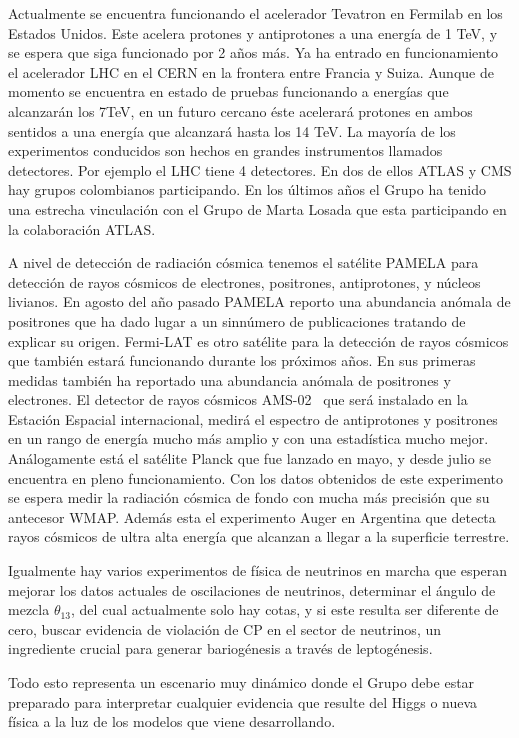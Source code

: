 Actualmente se encuentra funcionando el acelerador Tevatron en Fermilab en los Estados Unidos. Este acelera protones y antiprotones a una energía de 1 TeV, y se espera que siga funcionado por 2 años más. Ya ha entrado en funcionamiento el acelerador LHC en el CERN en la frontera entre Francia y Suiza. Aunque de momento se encuentra en estado de pruebas funcionando a energías que alcanzarán los 7TeV, en un futuro cercano éste acelerará protones en ambos sentidos a una energía que alcanzará hasta los 14 TeV. La mayoría de los experimentos conducidos son hechos en grandes instrumentos llamados detectores. Por ejemplo el LHC tiene 4 detectores. En dos de ellos ATLAS y CMS hay grupos colombianos participando. En los últimos años el Grupo ha tenido una estrecha vinculación con el Grupo de Marta Losada que esta participando en la colaboración ATLAS.

A nivel de detección de radiación cósmica tenemos el satélite PAMELA para detección de rayos cósmicos de electrones, positrones, antiprotones, y núcleos livianos. En agosto del año pasado PAMELA reporto una abundancia anómala de positrones %
que ha dado lugar a un sinnúmero de publicaciones tratando de explicar su origen.  Fermi-LAT es otro satélite para la detección de rayos cósmicos que también estará funcionando durante los próximos años. En sus primeras medidas %
también ha reportado una abundancia anómala de positrones y electrones. El detector de rayos cósmicos AMS-02~%
que será instalado en la Estación Espacial internacional, medirá el espectro de antiprotones y positrones en un rango de energía mucho más amplio y con una estadística mucho mejor. Análogamente está el satélite Planck que fue lanzado en mayo, y desde julio se encuentra en pleno funcionamiento. Con los datos obtenidos de este experimento se espera medir la radiación cósmica de fondo con mucha más precisión que su antecesor WMAP. Además esta el experimento Auger en Argentina que detecta rayos cósmicos de ultra alta energía que alcanzan a llegar a la superficie terrestre.

Igualmente hay varios experimentos de física de neutrinos en marcha que esperan mejorar los datos actuales de oscilaciones de neutrinos, determinar el ángulo de mezcla $\theta_{13}$, del cual actualmente solo hay cotas, y si este resulta ser diferente de cero, buscar evidencia de violación de CP en el sector de neutrinos, un ingrediente crucial para generar bariogénesis a través de leptogénesis.

Todo esto representa un escenario muy dinámico donde el Grupo debe estar preparado para interpretar cualquier evidencia que resulte del Higgs o nueva física a la luz de los modelos que viene desarrollando.

